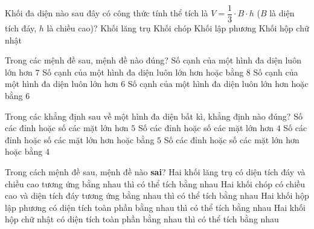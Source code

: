 \begin{ex}%
Khối đa diện nào sau đây có công thức tính thể tích là $V=\dfrac{1}{3}\cdot B\cdot h$ ($B$ là diện tích đáy, $h$ là chiều cao)?
\choice
{Khối lăng trụ}
{\True Khối chóp}
{Khối lập phương}
{Khối hộp chữ nhật}
\end{ex}

\begin{ex}%
Trong các mệnh đề sau, mệnh đề nào đúng?
\choice
{Số cạnh của một hình đa diện luôn lớn hơn $7$}
{Số cạnh của một hình đa diện luôn lớn hơn hoặc bằng $8$}
{Số cạnh của một hình đa diện luôn lớn hơn $6$}
{\True Số cạnh của  một hình đa diện luôn lớn hơn hoặc bằng $6$}

\end{ex}

\begin{ex}%
Trong các khẳng định sau về một hình đa diện bất kì, khẳng định nào đúng?
\choice
{Số các đỉnh hoặc số các mặt lớn hơn $5$}
{Số các đỉnh hoặc số các mặt lớn hơn $4$}
{Số các đỉnh hoặc số các mặt lớn hơn hoặc bằng $5$}
{\True Số các đỉnh hoặc số các mặt lớn hơn hoặc bằng $4$}
\end{ex}

\begin{ex}%
Trong cách mệnh đề sau, mệnh đề nào \textbf{sai}?
\choice
{Hai khối lăng trụ có diện tích đáy và chiều cao tương ứng bằng nhau thì có thể tích bằng nhau}
{Hai khối chóp có chiều cao và diện tích đáy tương ứng bằng nhau thì có thể tích bằng nhau}
{Hai khối hộp lập phương có diện tích toàn phần bằng nhau thì có thể tích bằng nhau}
{\True Hai khối hộp chữ nhật có diện tích toàn phần bằng nhau thì có thể tích bằng nhau}
\end{ex}


